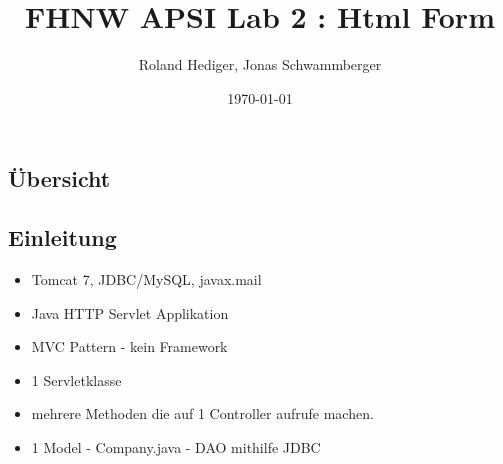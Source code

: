 \documentclass{beamer}
\begin{document}
\title{FHNW APSI Lab 2 : Html Form}   
\author{Roland Hediger, Jonas Schwammberger} 

\date{\today} 

\frame{\titlepage} 

\begin{frame}
\section*{Übersicht}
\tableofcontents
\end{frame} 

\begin{frame}
 \section{Einleitung}
 \begin{itemize}
 	\item Tomcat 7, JDBC/MySQL, javax.mail
  \item Java HTTP Servlet Applikation
  \item MVC Pattern - kein Framework 
  \item 1 Servletklasse 
  \item mehrere Methoden die auf 1 Controller aufrufe machen.
  \item 1 Model - Company.java - DAO mithilfe JDBC
 \end{itemize}
\end{frame}
\end{document}
